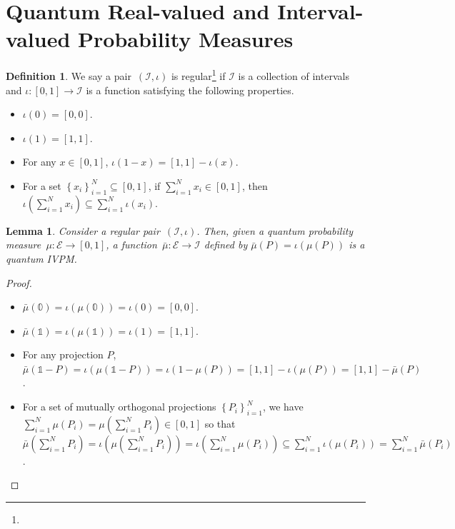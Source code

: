 \documentclass[12pt]{iopart}
\theoremstyle{plain}
\newtheorem{lemma}[thm]{Lemma}
\theoremstyle{definition}
\newtheorem{definition}[thm]{Definition}
\theoremstyle{remark}
\newcommand{\events}{\ensuremath{\mathcal{E}}}
\newcommand{\yutsung}[1]{\fbox{\begin{minipage}{0.9\textwidth}\color{purple}{Yu-Tsung says: #1}\end{minipage}}}
\begin{document}
\section{Quantum Real-valued and Interval-valued Probability Measures\label{sec:Real-and-Interval}}

\begin{definition}We say a pair~$\left(\mathscr{I},\iota\right)$
is regular\footnote{\yutsung{''regular'' is just a random name pop into my mind...

This whole definition might be rewritten using category theory...
I would investigate it if it is necessary...}} if $\mathscr{I}$ is a collection of intervals and $\iota:\left[0,1\right]\rightarrow\mathscr{I}$
is a function satisfying the following properties. 
\begin{itemize}
\item $\iota\left(0\right)=\left[0,0\right]$. 
\item $\iota\left(1\right)=\left[1,1\right]$. 
\item For any $x\in\left[0,1\right]$, $\iota\left(1-x\right)=\left[1,1\right]-\iota\left(x\right)$. 
\item For a set $\left\{ x_{i}\right\} _{i=1}^{N}\subseteq\left[0,1\right]$,
if $\sum_{i=1}^{N}x_{i}\in\left[0,1\right]$, then $\iota\left(\sum_{i=1}^{N}x_{i}\right)\subseteq\sum_{i=1}^{N}\iota\left(x_{i}\right)$. 
\end{itemize}
\end{definition}

\begin{lemma}Consider a regular pair~$\left(\mathscr{I},\iota\right)$.
Then, given a quantum probability measure~$\mu:\events\rightarrow\left[0,1\right]$,
a function~$\bar{\mu}:\events\rightarrow\mathscr{I}$ defined by
$\bar{\mu}(P)=\iota\left(\mu(P)\right)$ is a quantum IVPM.\end{lemma}

\begin{proof}~
\begin{itemize}
\item $\bar{\mu}(\mathbb{0})=\iota\left(\mu(\mathbb{0})\right)=\iota\left(0\right)=\left[0,0\right]$.
\item $\bar{\mu}(\mathbb{1})=\iota\left(\mu(\mathbb{1})\right)=\iota\left(1\right)=\left[1,1\right]$.
\item For any projection $P$, $\bar{\mu}\left(\mathbb{1}-P\right)=\iota\left(\mu(\mathbb{1}-P)\right)=\iota\left(1-\mu(P)\right)=\left[1,1\right]-\iota\left(\mu(P)\right)=\left[1,1\right]-\bar{\mu}\left(P\right)$.
\item For a set of mutually orthogonal projections $\left\{ P_{i}\right\} _{i=1}^{N}$,
we have $\sum_{i=1}^{N}\mu\left(P_{i}\right)=\mu\left(\sum_{i=1}^{N}P_{i}\right)\in\left[0,1\right]$
so that $\bar{\mu}\left(\sum_{i=1}^{N}P_{i}\right)=\iota\left(\mu\left(\sum_{i=1}^{N}P_{i}\right)\right)=\iota\left(\sum_{i=1}^{N}\mu\left(P_{i}\right)\right)\subseteq\sum_{i=1}^{N}\iota\left(\mu\left(P_{i}\right)\right)=\sum_{i=1}^{N}\bar{\mu}\left(P_{i}\right)$.
\end{itemize}
\end{proof}
\end{document}

